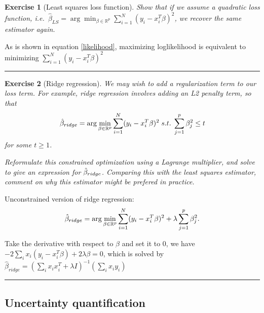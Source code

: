 \documentclass[twoside]{article}
\newcounter{lecnum}
\newtheorem{exercise}{Exercise}[lecnum]
\newenvironment{proof}{{\bf Proof:}}{\hfill\rule{2mm}{2mm}}
\begin{document}
\begin{exercise}[Least squares loss function]
  Show that if we assume a quadratic loss function, i.e.\ $\hat{\beta}_{LS} = \arg\min_{\beta\in \mathbb{R}^p}\sum_{i=1}^N(y_i - x_i^T\beta)^2$, we recover the same estimator again.
\end{exercise}

\begin{proof}
As is shown in equation \ref{likelihood}, maximizing loglikelihood is equivalent to minimizing $\sum_{i=1}^N(y_i - x_i^T\beta)^2$
\end{proof}
\begin{exercise}[Ridge regression]
  We may wish to add a regularization term to our loss term. For example, ridge regression involves adding an L2 penalty term, so that
  $$\hat{\beta}_{\small{ridge}} = \arg\min_{\beta\in \mathbb{R}^p}\sum_{i=1}^N(y_i - x_i^T\beta)^2 \; s.t. \; \sum_{j=1}^p \beta_j^2 \leq t$$
  for some $t\geq 1$.

  Reformulate this constrained optimization using a Lagrange multiplier, and solve to give an expression for $\hat{\beta}_{\small{ridge}}$. Comparing this with the least squares estimator, comment on why this estimator might be prefered in practice.
\end{exercise}
\begin{proof}
Unconstrained version of ridge regression:
$$\hat{\beta}_{\small{ridge}} = \arg\min_{\beta\in \mathbb{R}^p}\sum_{i=1}^N(y_i - x_i^T\beta)^2 + \lambda\sum_{j=1}^p \beta_j^2.$$

Take the derivative with respect to $\beta$ and set it to $0$, we have $-2\sum_i x_i(y_i-x_i^T\beta) + 2\lambda \beta = 0$, which is solved by $\hat{\beta}_{ridge} = (\sum_ix_ix_i^T+ \lambda I)^{-1}(\sum_ix_iy_i)$
\end{proof}
  
\subsection{Uncertainty quantification}
\end{document}
